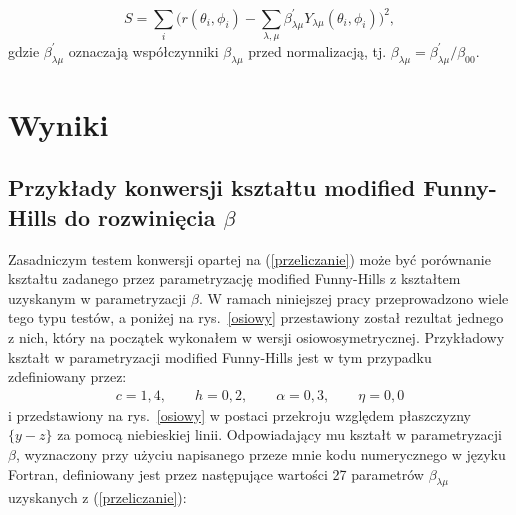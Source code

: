 \documentclass[a4paper,polish]{article}
\numberwithin{equation}{section}
\begin{document}
\begin{equation}
S=\sum \limits_{i} \Big( r(\theta_i, \phi_i) - \sum \limits_{\lambda, \mu} \beta_{\lambda \mu}^{'} Y_{\lambda \mu}(\theta_i, \phi_i) \Big )^2,
\end{equation}
gdzie $\beta_{\lambda \mu}^{'}$ oznaczają współczynniki $\beta_{\lambda \mu}$ przed normalizacją, tj. $\beta_{\lambda \mu}=\beta_{\lambda \mu}^{'}/\beta_{0 0}$. 

\clearpage
\section{Wyniki}

\subsection{Przykłady konwersji kształtu modified Funny-Hills do rozwinięcia $\beta$}

Zasadniczym testem konwersji opartej na (\ref{przeliczanie}) może być porównanie kształtu zadanego przez parametryzację modified Funny-Hills z kształtem uzyskanym w parametryzacji $\beta$. W ramach niniejszej pracy przeprowadzono wiele tego typu testów, a poniżej na rys.~\ref{osiowy} przestawiony został rezultat jednego z nich, który na początek wykonałem w wersji osiowosymetrycznej. Przykładowy kształt w parametryzacji modified Funny-Hills jest w tym przypadku zdefiniowany przez:
\begin{gather*}
c=1,4, \qquad h=0,2, \qquad \alpha=0,3, \qquad \eta=0,0
\end{gather*}
i przedstawiony na rys.~\ref{osiowy} w postaci przekroju względem płaszczyzny $\{y-z\}$ za pomocą niebieskiej linii. Odpowiadający mu kształt w parametryzacji $\beta$, wyznaczony przy użyciu napisanego przeze mnie kodu numerycznego w języku Fortran, definiowany jest przez następujące wartości 27 parametrów $\beta_{\lambda \mu}$ uzyskanych z (\ref{przeliczanie}):
\end{document}
